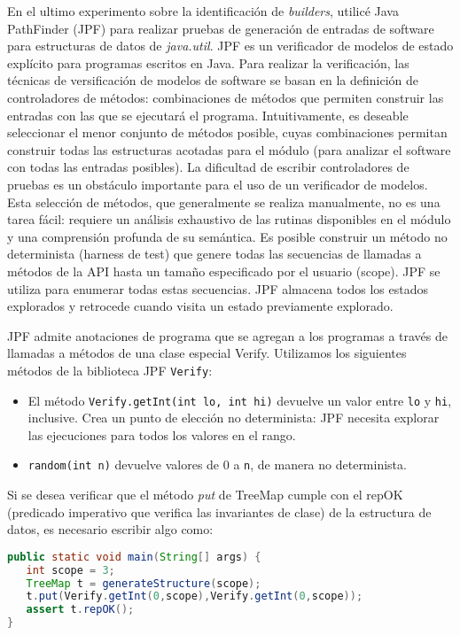 En el ultimo experimento sobre la identificación de \emph{builders}, utilicé Java PathFinder \cite{Visser:2005} (JPF) para realizar pruebas de generación de entradas de software para estructuras de datos de \emph{java.util}. JPF  es un verificador de modelos de estado explícito para programas escritos en Java. Para realizar la verificación, las técnicas de versificación de modelos de software se basan en la definición de controladores de métodos: combinaciones de métodos que permiten construir las entradas con las que se ejecutará el programa. Intuitivamente, es deseable seleccionar el menor conjunto de métodos posible, cuyas combinaciones permitan construir todas las estructuras acotadas para el módulo (para analizar el software con todas las entradas posibles). La dificultad de escribir controladores de pruebas es un obstáculo importante para el uso de un verificador de modelos. Esta selección de métodos, que generalmente se realiza manualmente, no es una tarea fácil: requiere un análisis exhaustivo de las rutinas disponibles en el módulo y una comprensión profunda de su semántica.
Es posible construir un método no determinista (harness de test) que genere todas las secuencias de llamadas a métodos de la API hasta un tamaño especificado por el usuario (scope). JPF se utiliza para enumerar todas estas secuencias. JPF almacena todos los estados explorados y retrocede cuando visita un estado previamente explorado.

JPF admite anotaciones de programa que se agregan a los programas a través de llamadas a métodos de una clase especial Verify.
Utilizamos los siguientes métodos de la biblioteca JPF \verb"Verify":
\\
\begin{itemize}
\item El método \verb"Verify.getInt(int lo, int hi)" devuelve un valor entre \verb"lo" y \verb"hi", inclusive. Crea un punto de elección no determinista: JPF necesita explorar las ejecuciones para todos los valores en el rango.
\item \verb"random(int n)" devuelve valores de 0 a \verb"n", de manera no determinista.
\end{itemize}

Si se desea verificar que el método \emph{put}  de TreeMap cumple con el repOK (predicado imperativo que verifica las invariantes de clase) de la estructura de datos, es necesario escribir algo como: 
\\

\begin{lstlisting}[caption={Probando el método put de TreeMap con JPF},label={lst:label},language=Java,captionpos=b]
public static void main(String[] args) {
   int scope = 3;
   TreeMap t = generateStructure(scope);
   t.put(Verify.getInt(0,scope),Verify.getInt(0,scope));
   assert t.repOK();
}
\end{lstlisting}

